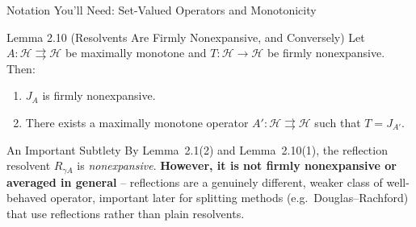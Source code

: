 \documentclass[aspectratio=169,10pt]{beamer}
\begin{document}
\begin{frame}[allowframebreaks]{Notation You'll Need: Set-Valued Operators and Monotonicity}
  \begin{block}{Lemma 2.10 (Resolvents Are Firmly Nonexpansive, and Conversely)}
    Let $A : \mathcal{H} \rightrightarrows \mathcal{H}$ be maximally monotone
    and $T : \mathcal{H} \to \mathcal{H}$ be firmly nonexpansive. Then:
    \begin{enumerate}
      \item[(1)] $J_A$ is firmly nonexpansive.
      \item[(2)] There exists a maximally monotone operator
        $A' : \mathcal{H} \rightrightarrows \mathcal{H}$ such that
        $T = J_{A'}$.
    \end{enumerate}
  \end{block}

  \begin{alertblock}{An Important Subtlety}
    By Lemma~2.1(2) and Lemma~2.10(1), the reflection resolvent $R_{\gamma A}$
    is \emph{nonexpansive}. \textbf{However, it is not firmly nonexpansive or
    averaged in general} -- reflections are a genuinely different, weaker
    class of well-behaved operator, important later for splitting methods
    (e.g.\ Douglas--Rachford) that use reflections rather than plain
    resolvents.
  \end{alertblock}

\end{frame}
\end{document}
